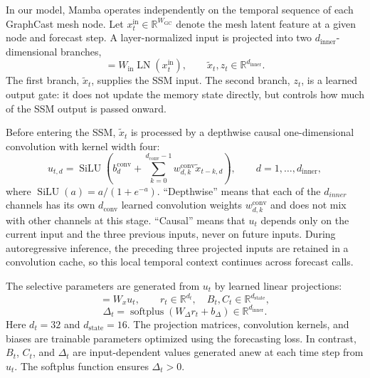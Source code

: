 \documentclass{article}
\begin{document}
In our model, Mamba operates independently on the temporal sequence of each GraphCast mesh node. Let $x_t^{\mathrm{in}}\in\mathbb{R}^{W_{\textrm{GC}}}$ denote the mesh latent feature at a given node and forecast step. A layer-normalized input is projected into two $d_{\textrm{inner}}$-dimensional branches,
\begin{equation}
    [\tilde{x}_t,z_t]
    =
    W_{\mathrm{in}}\operatorname{LN}(x_t^{\mathrm{in}}),
    \qquad
    \tilde{x}_t,z_t\in\mathbb{R}^{d_{\textrm{inner}}}.
\end{equation}
The first branch, $\tilde{x}_t$, supplies the SSM input. The second branch, $z_t$, is a learned output gate: it does not update the memory state directly, but controls how much of the SSM output is passed onward.

Before entering the SSM, $\tilde{x}_t$ is processed by a depthwise causal one-dimensional convolution with kernel width four:
\begin{equation}
    u_{t,d}
    =
    \operatorname{SiLU}
    \left(
        b^{\mathrm{conv}}_d
        +
        \sum_{k=0}^{d_{\textrm{conv}}-1}
        w^{\mathrm{conv}}_{d,k}\tilde{x}_{t-k,d}
    \right),
    \qquad d=1,\ldots, d_{\textrm{inner}},
\end{equation}
where $\operatorname{SiLU}(a)=a/(1+e^{-a})$. ``Depthwise'' means that each of the $d_{inner}$ channels has its own $d_{\textrm{conv}}$ learned convolution weights $w^{\mathrm{conv}}_{d,k}$ and does not mix with other channels at this stage. ``Causal'' means that $u_t$ depends only on the current input and the three previous inputs, never on future inputs. During autoregressive inference, the preceding three projected inputs are retained in a convolution cache, so this local temporal context continues across forecast calls.

The selective parameters are generated from $u_t$ by learned linear projections:
\begin{equation}
    [r_t,B_t,C_t] = W_xu_t,
    \qquad
    r_t\in\mathbb{R}^{d_t},
    \quad
    B_t,C_t\in\mathbb{R}^{d_{\textrm{state}}},
\end{equation}
\begin{equation}
    \Delta_t
    =
    \operatorname{softplus}(W_\Delta r_t+b_\Delta)
    \in\mathbb{R}^{d_{\textrm{inner}}}.
\end{equation}
Here $d_t=32$ and $d_{\mathrm{state}}=16$. The projection matrices, convolution kernels, and biases are trainable parameters optimized using the forecasting loss. In contrast, $B_t$, $C_t$, and $\Delta_t$ are input-dependent values generated anew at each time step from $u_t$. The softplus function ensures $\Delta_t>0$.
\end{document}
